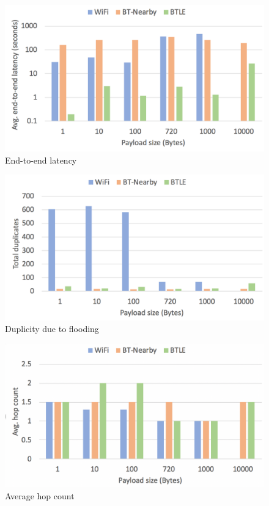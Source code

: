 \documentclass[conference]{IEEEtran}
\begin{document}
\begin{figure}[htbp]
\centerline{\includegraphics[width=\columnwidth]{figs/e2e_latency}}
\caption{End-to-end latency}
\label{fig:e2e}
\end{figure}

\begin{figure}[htbp]
\centerline{\includegraphics[width=\columnwidth]{figs/duplicates}}
\caption{Duplicity due to flooding}
\label{fig:dup}
\end{figure}

\begin{figure}[htbp]
\centerline{\includegraphics[width=\columnwidth]{figs/hops}}
\caption{Average hop count}
\label{fig:hop}
\end{figure}
\end{document}
